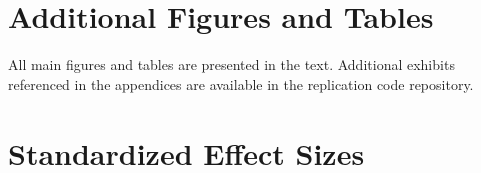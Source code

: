 \documentclass[12pt]{article}
\begin{document}
\section{Additional Figures and Tables}

All main figures and tables are presented in the text. Additional exhibits referenced in the appendices are available in the replication code repository.

\section{Standardized Effect Sizes}
\label{sec:sde}
\end{document}
